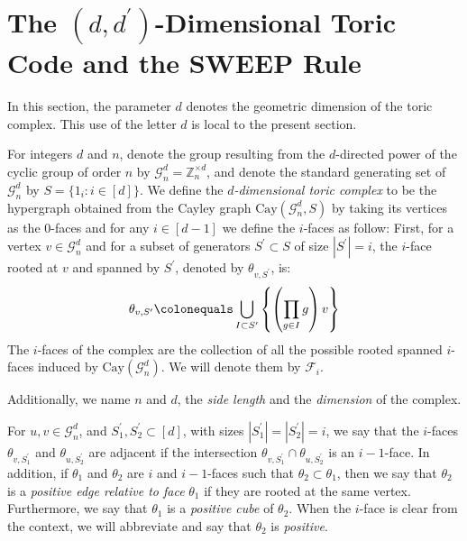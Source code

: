 

\section{The $(d,d^{\prime})$-Dimensional Toric Code and the SWEEP Rule}

In this section, the parameter $d$ denotes the geometric dimension of the toric complex. This use of the letter $d$ is local to the present section.

\begin{definition} 
  \label{def:toric_complex}
  For integers $d$ and $n$, denote the group resulting from the $d$-directed power of the cyclic group of order $n$ by $\mathcal{G}_{n}^{d} = \mathbb{Z}_{n}^{\times d}$, and denote the standard generating set of $\mathcal{G}_{n}^{d}$ by $S = \{ 1_{i} \colon i \in [d] \}$. We define the \textit{$d$-dimensional toric complex} to be the hypergraph obtained from the Cayley graph $\text{Cay}(\mathcal{G}_{n}^{d}, S)$ by taking its vertices as the $0$-faces and for any $i \in [d-1]$ we define the $i$-faces as follow: First, for a vertex $v \in \mathcal{G}_{n}^{d}$ and for a subset of generators $S^{\prime} \subset S$ of size $|S^{\prime}| = i$, the $i$-face rooted at $v$ and spanned by $S^{\prime}$, denoted by $\theta_{v, S^{\prime}}$, is:
  \begin{equation*}
    \begin{split}
      \theta_{v,S^{\prime}} \colonequals \bigcup_{I \subset S^{\prime}} \left\{  \left(\prod_{g \in I} g \right) v  \right\}
    \end{split}
  \end{equation*}
  The $i$-faces of the complex are the collection of all the possible rooted spanned $i$-faces induced by $\text{Cay}(\mathcal{G}_{n}^{d})$. We will denote them by $\mathcal{F}_{i}$. 

  Additionally, we name $n$ and $d$, the \textit{side length} and the \textit{dimension} of the complex.  
\end{definition}
\begin{definition}
  For $u,v \in \mathcal{G}_{n}^{d}$, and $S^{\prime}_{1},S^{\prime}_{2} \subset [d]$, with sizes $|S^{\prime}_{1}| = |S^{\prime}_{2}| = i$, we say that the $i$-faces $\theta_{v,S^{\prime}_{1}}$ and $\theta_{u,S^{\prime}_{2}}$ are adjacent if the intersection $\theta_{v,S^{\prime}_{1}} \cap \theta_{u,S^{\prime}_{2}}$ is an $i-1$-face. In addition, if $\theta_{1}$ and $\theta_{2}$ are $i$ and $i-1$-faces such that $\theta_{2} \subset \theta_{1}$, then we say that $\theta_{2}$ is a \textit{positive edge relative to face} $\theta_{1}$ if they are rooted at the same vertex. Furthermore, we say that $\theta_{1}$ is a \textit{positive cube} of $\theta_{2}$. When the $i$-face is clear from the context, we will abbreviate and say that $\theta_{2}$ is \textit{positive}.
\end{definition}
